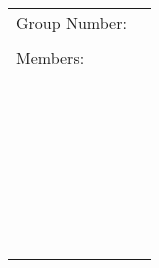\documentclass[
  course = {{MATH102 Calculus II}},
  quartile = {{2}},
  assignment = 2,
  firstexercise = 1,
  term = 202
]{aga-homework}
\begin{document}

\begin{center}
  {\large
  \begin{tabular}{|l|l|}
    \hline
    Group Number: & \hspace{3in} \\
     &  \\ \hline
    Members: &  \\
        &  \\ \cline{2-2}
        &  \\
        &  \\ \cline{2-2}
        &  \\
        &  \\ \cline{2-2}
        &  \\
        &  \\ \cline{2-2}
        &  \\
        &  \\ \cline{2-2}
        &  \\
        &  \\ \cline{2-2}
        &  \\
        &  \\ \cline{2-2}
        &  \\
        &  \\ \cline{2-2}
        &  \\
        &  \\ \cline{2-2}
        &  \\
        &  \\ \cline{2-2}
        &  \\
        &  \\ \cline{2-2}
        &  \\
        &  \\ \cline{2-2}
        &  \\
        &  \\ \cline{2-2}
        &  \\
        &  \\ \cline{2-2}
        &  \\
        &  \\ \cline{2-2}
        &  \\
        &  \\
    \hline
  \end{tabular}
  }
\end{center}
\end{document}
